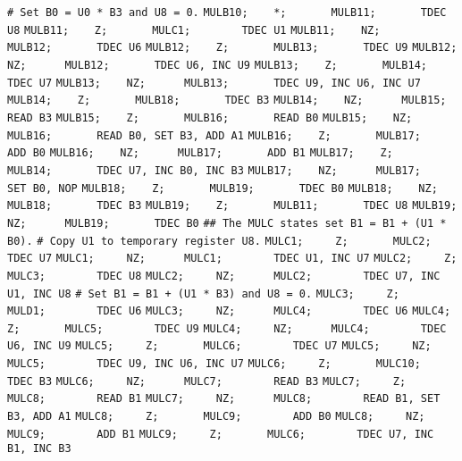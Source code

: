 \begin{apgsembly}
	\begin{minipage}[t]{.49\textwidth}
		\begin{algorithmic}\tiny
			\State \verb|# Set B0 = U0 * B3 and U8 = 0.|
			\State \verb|MULB10;    *;       MULB11;       TDEC U8|
			\State \verb|MULB11;    Z;       MULC1;        TDEC U1|
			\State \verb|MULB11;    NZ;      MULB12;       TDEC U6|
			\State \verb|MULB12;    Z;       MULB13;       TDEC U9|
			\State \verb|MULB12;    NZ;      MULB12;       TDEC U6, INC U9|
			\State \verb|MULB13;    Z;       MULB14;       TDEC U7|
			\State \verb|MULB13;    NZ;      MULB13;       TDEC U9, INC U6, INC U7|
			\State \verb|MULB14;    Z;       MULB18;       TDEC B3|
			\State \verb|MULB14;    NZ;      MULB15;       READ B3|
			\State \verb|MULB15;    Z;       MULB16;       READ B0|
			\State \verb|MULB15;    NZ;      MULB16;       READ B0, SET B3, ADD A1|
			\State \verb|MULB16;    Z;       MULB17;       ADD B0|
			\State \verb|MULB16;    NZ;      MULB17;       ADD B1|
			\State \verb|MULB17;    Z;       MULB14;       TDEC U7, INC B0, INC B3|
			\State \verb|MULB17;    NZ;      MULB17;       SET B0, NOP|
			\State \verb|MULB18;    Z;       MULB19;       TDEC B0|
			\State \verb|MULB18;    NZ;      MULB18;       TDEC B3|
			\State \verb|MULB19;    Z;       MULB11;       TDEC U8|
			\State \verb|MULB19;    NZ;      MULB19;       TDEC B0|
			\State \verb||
			\State \verb|## The MULC states set B1 = B1 + (U1 * B0).|
			\State \verb|# Copy U1 to temporary register U8.|
			\State \verb|MULC1;     Z;       MULC2;        TDEC U7|
			\State \verb|MULC1;     NZ;      MULC1;        TDEC U1, INC U7|
			\State \verb|MULC2;     Z;       MULC3;        TDEC U8|
			\State \verb|MULC2;     NZ;      MULC2;        TDEC U7, INC U1, INC U8|
			\State \verb||
			\State \verb|# Set B1 = B1 + (U1 * B3) and U8 = 0.|
			\State \verb|MULC3;     Z;       MULD1;        TDEC U6|
			\State \verb|MULC3;     NZ;      MULC4;        TDEC U6|
			\State \verb|MULC4;     Z;       MULC5;        TDEC U9|
			\State \verb|MULC4;     NZ;      MULC4;        TDEC U6, INC U9|
			\State \verb|MULC5;     Z;       MULC6;        TDEC U7|
			\State \verb|MULC5;     NZ;      MULC5;        TDEC U9, INC U6, INC U7|
			\State \verb|MULC6;     Z;       MULC10;       TDEC B3|
			\State \verb|MULC6;     NZ;      MULC7;        READ B3|
			\State \verb|MULC7;     Z;       MULC8;        READ B1|
			\State \verb|MULC7;     NZ;      MULC8;        READ B1, SET B3, ADD A1|
			\State \verb|MULC8;     Z;       MULC9;        ADD B0|
			\State \verb|MULC8;     NZ;      MULC9;        ADD B1|
			\State \verb|MULC9;     Z;       MULC6;        TDEC U7, INC B1, INC B3|

\end{algorithmic}
\end{minipage}
\end{apgsembly}
